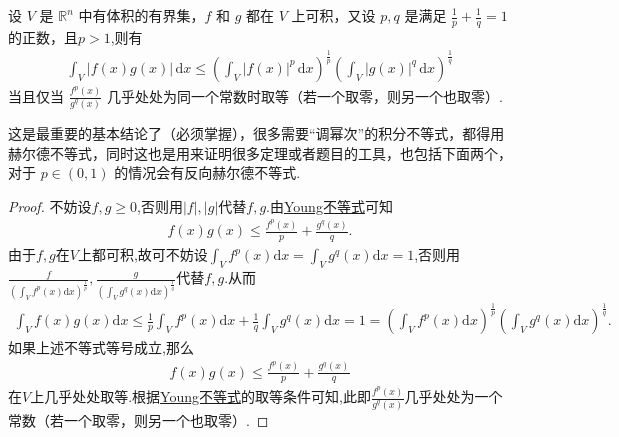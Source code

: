 \documentclass[../../main.tex]{subfiles}%
\begin{document}
\begin{theorem}[Hölder不等式]\label{theorem:Hölder(赫尔德)不等式(积分形式)}
设 $V$ 是 $\mathbb{R}^n$ 中有体积的有界集，$f$ 和 $g$ 都在 $V$ 上可积，又设 $p,q$ 是满足 $\frac{1}{p} + \frac{1}{q} = 1$ 的正数，且$p>1$,则有
\begin{align*}
\int_V |f(x)g(x)| \, \mathrm{d}x \leqslant \left( \int_V |f(x)|^p \, \mathrm{d}x \right)^{\frac{1}{p}} \left( \int_V |g(x)|^q \, \mathrm{d}x \right)^{\frac{1}{q}}
\end{align*}
当且仅当 $\frac{f^p(x)}{g^q(x)}$ 几乎处处为同一个常数时取等（若一个取零，则另一个也取零）.
\end{theorem}
\begin{remark}
这是最重要的基本结论了（必须掌握），很多需要“调幂次”的积分不等式，都得用赫尔德不等式，同时这也是用来证明很多定理或者题目的工具，也包括下面两个，对于 $p \in (0,1)$ 的情况会有反向赫尔德不等式.
\end{remark}
\begin{proof}

不妨设$f,g\geqslant 0$,否则用$|f|,|g|$代替$f,g$.由\hyperref[theorem:Young不等式]{Young不等式}可知
\begin{align*}
f(x)g(x) \leqslant \frac{f^p(x)}{p}+\frac{g^q(x)}{q}.
\end{align*}
由于$f,g$在$V$上都可积,故可不妨设$\int_V f^p(x) \mathrm{d}x=\int_V g^q(x) \mathrm{d}x=1$,否则用$\frac{f}{\left( \int_V f^p(x) \mathrm{d}x \right)^{\frac{1}{p}}},\frac{g}{\left( \int_V g^q(x) \mathrm{d}x \right)^{\frac{1}{q}}}$代替$f,g$.从而
\begin{align*}
\int_V f(x)g(x) \mathrm{d}x \leqslant \frac{1}{p}\int_V f^p(x) \mathrm{d}x+\frac{1}{q}\int_V g^q(x) \mathrm{d}x=1=\left( \int_V f^p(x) \mathrm{d}x \right)^{\frac{1}{p}}\left( \int_V g^q(x) \mathrm{d}x \right)^{\frac{1}{q}}.
\end{align*}
如果上述不等式等号成立,那么
\begin{align*}
f(x)g(x) \leqslant \frac{f^p(x)}{p}+\frac{g^q(x)}{q}
\end{align*}
在$V$上几乎处处取等.根据\hyperref[theorem:Young不等式]{Young不等式}的取等条件可知,此即$\frac{f^p(x)}{g^q(x)}$几乎处处为一个常数（若一个取零，则另一个也取零）.

\end{proof}
\end{document}
